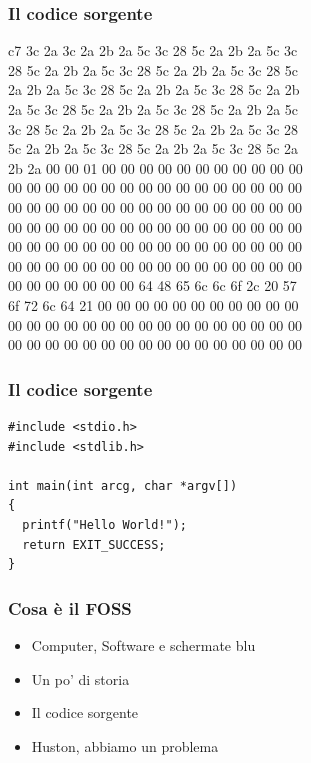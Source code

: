 \documentclass{beamer}
\begin{document}
\begin{frame}
  \frametitle{Il codice sorgente}
  \fontsize{12}{7.2}\selectfont
  \begin{center}
c7 3c 2a 3c 2a 2b 2a 5c 3c 28 5c 2a 2b 2a 5c 3c\\
28 5c 2a 2b 2a 5c 3c 28 5c 2a 2b 2a 5c 3c 28 5c\\
2a 2b 2a 5c 3c 28 5c 2a 2b 2a 5c 3c 28 5c 2a 2b\\
2a 5c 3c 28 5c 2a 2b 2a 5c 3c 28 5c 2a 2b 2a 5c\\
3c 28 5c 2a 2b 2a 5c 3c 28 5c 2a 2b 2a 5c 3c 28\\
5c 2a 2b 2a 5c 3c 28 5c 2a 2b 2a 5c 3c 28 5c 2a\\
2b 2a 00 00 01 00 00 00 00 00 00 00 00 00 00 00\\
00 00 00 00 00 00 00 00 00 00 00 00 00 00 00 00\\
00 00 00 00 00 00 00 00 00 00 00 00 00 00 00 00\\
00 00 00 00 00 00 00 00 00 00 00 00 00 00 00 00\\
00 00 00 00 00 00 00 00 00 00 00 00 00 00 00 00\\
00 00 00 00 00 00 00 00 00 00 00 00 00 00 00 00\\
00 00 00 00 00 00 00 64 48 65 6c 6c 6f 2c 20 57\\
6f 72 6c 64 21 00 00 00 00 00 00 00 00 00 00 00\\
00 00 00 00 00 00 00 00 00 00 00 00 00 00 00 00\\
00 00 00 00 00 00 00 00 00 00 00 00 00 00 00 00
  \end{center}

\end{frame}


\begin{frame}[fragile]
  \frametitle{Il codice sorgente}
  
  \begin{verbatim}
#include <stdio.h>
#include <stdlib.h>

int main(int arcg, char *argv[])
{
  printf("Hello World!");
  return EXIT_SUCCESS;
}
  \end{verbatim}

\end{frame}

\begin{frame}
  \frametitle{Cosa \`e il FOSS}

  \begin{itemize}
    \item Computer, Software e schermate blu
    \item Un po' di storia
    \item Il codice sorgente
    \item Huston, abbiamo un problema
  \end{itemize}

\end{frame}
\end{document}
